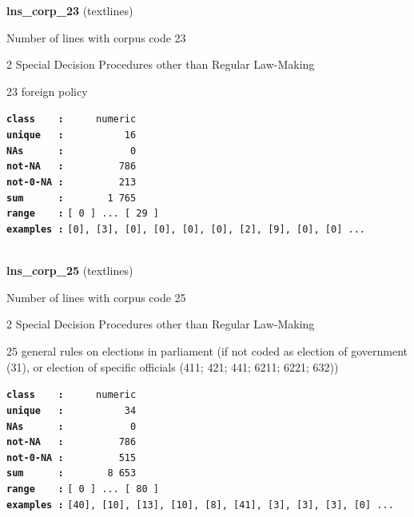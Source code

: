 \documentclass[]{article}
\begin{document}
\textbf{lns\_corp\_23} (textlines)

Number of lines with corpus code 23

2 Special Decision Procedures other than Regular Law-Making

23 foreign policy

\textbf{\texttt{class\ \ \ \ :}} \texttt{~~~~~numeric}\\
\textbf{\texttt{unique\ \ \ :}} \texttt{~~~~~~~~~~16}\\
\textbf{\texttt{NAs\ \ \ \ \ \ :}} \texttt{~~~~~~~~~~~0}\\
\textbf{\texttt{not-NA\ \ \ :}} \texttt{~~~~~~~~~786}\\
\textbf{\texttt{not-0-NA\ :}} \texttt{~~~~~~~~~213}\\
\textbf{\texttt{sum\ \ \ \ \ \ :}} \texttt{~~~~~~~1~765}\\
\textbf{\texttt{range\ \ \ \ :}}
\texttt{{[}\ 0\ {]}\ ...\ {[}\ 29\ {]}}\\
\textbf{\texttt{examples\ :}}
\texttt{{[}0{]},\ {[}3{]},\ {[}0{]},\ {[}0{]},\ {[}0{]},\ {[}0{]},\ {[}2{]},\ {[}9{]},\ {[}0{]},\ {[}0{]}\ ...}\\

~

\textbf{lns\_corp\_25} (textlines)

Number of lines with corpus code 25

2 Special Decision Procedures other than Regular Law-Making

25 general rules on elections in parliament (if not coded as election of
government (31), or election of specific officials (411; 421; 441; 6211;
6221; 632))

\textbf{\texttt{class\ \ \ \ :}} \texttt{~~~~~numeric}\\
\textbf{\texttt{unique\ \ \ :}} \texttt{~~~~~~~~~~34}\\
\textbf{\texttt{NAs\ \ \ \ \ \ :}} \texttt{~~~~~~~~~~~0}\\
\textbf{\texttt{not-NA\ \ \ :}} \texttt{~~~~~~~~~786}\\
\textbf{\texttt{not-0-NA\ :}} \texttt{~~~~~~~~~515}\\
\textbf{\texttt{sum\ \ \ \ \ \ :}} \texttt{~~~~~~~8~653}\\
\textbf{\texttt{range\ \ \ \ :}}
\texttt{{[}\ 0\ {]}\ ...\ {[}\ 80\ {]}}\\
\textbf{\texttt{examples\ :}}
\texttt{{[}40{]},\ {[}10{]},\ {[}13{]},\ {[}10{]},\ {[}8{]},\ {[}41{]},\ {[}3{]},\ {[}3{]},\ {[}3{]},\ {[}0{]}\ ...}\\
\end{document}
